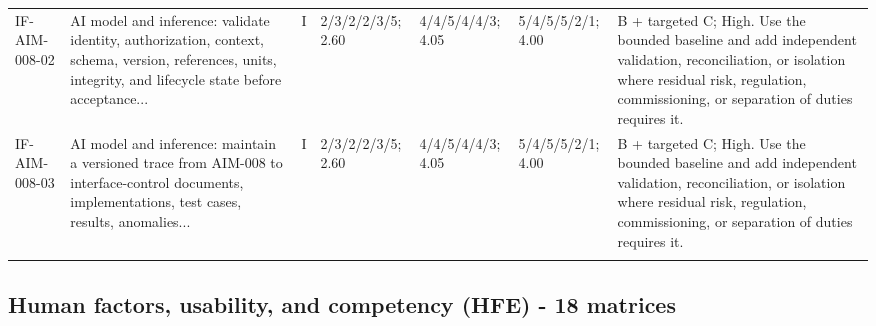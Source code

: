 \documentclass[11pt,letterpaper]{article}
\begin{document}
\begin{scriptsize}
\begin{longtable}{@{}L{0.11\textwidth}L{0.165\textwidth}L{0.04\textwidth}L{0.115\textwidth}L{0.115\textwidth}L{0.115\textwidth}L{0.235\textwidth}@{}}
\addlinespace[2pt]
IF-AIM-008-02 & AI model and inference: validate identity, authorization, context, schema, version, references, units, integrity, and lifecycle state before acceptance... & I & 2/3/2/2/3/5; 2.60 & 4/4/5/4/4/3; 4.05 & 5/4/5/5/2/1; 4.00 & B + targeted C; High. Use the bounded baseline and add independent validation, reconciliation, or isolation where residual risk, regulation, commissioning, or separation of duties requires it. \\
\addlinespace[2pt]
IF-AIM-008-03 & AI model and inference: maintain a versioned trace from AIM-008 to interface-control documents, implementations, test cases, results, anomalies... & I & 2/3/2/2/3/5; 2.60 & 4/4/5/4/4/3; 4.05 & 5/4/5/5/2/1; 4.00 & B + targeted C; High. Use the bounded baseline and add independent validation, reconciliation, or isolation where residual risk, regulation, commissioning, or separation of duties requires it. \\
\addlinespace[2pt]
\end{longtable}
\end{scriptsize}

\subsection{Human factors, usability, and competency (HFE) - 18 matrices}
\end{document}

